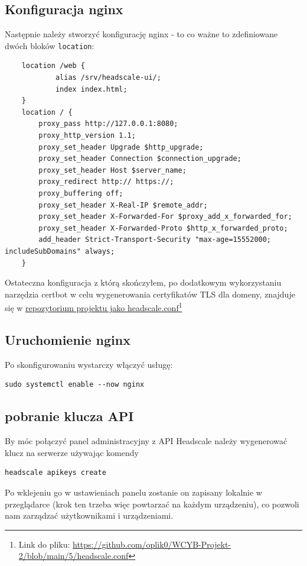 \documentclass[../main.tex]{subfiles}
\begin{document}
\begin{samepage}    
\subsection{Konfiguracja nginx}
Następnie należy stworzyć konfigurację nginx - to co ważne to zdefiniowane dwóch bloków \texttt{location}:
\begin{verbatim}
    location /web {
            alias /srv/headscale-ui/;
            index index.html;
    }
    location / {
        proxy_pass http://127.0.0.1:8080;
        proxy_http_version 1.1;
        proxy_set_header Upgrade $http_upgrade;
        proxy_set_header Connection $connection_upgrade;
        proxy_set_header Host $server_name;
        proxy_redirect http:// https://;
        proxy_buffering off;
        proxy_set_header X-Real-IP $remote_addr;
        proxy_set_header X-Forwarded-For $proxy_add_x_forwarded_for;
        proxy_set_header X-Forwarded-Proto $http_x_forwarded_proto;
        add_header Strict-Transport-Security "max-age=15552000; includeSubDomains" always;
    }
\end{verbatim}
Ostateczna konfiguracja z którą skończyłem, po dodatkowym wykorzystaniu narzędzia certbot w celu wygenerowania certyfikatów TLS dla domeny, znajduje się w \href{https://github.com/oplik0/WCYB-Projekt-2/blob/main/5/headscale.conf}{repozytorium projektu jako headscale.conf}\footnote{Link do pliku: \url{https://github.com/oplik0/WCYB-Projekt-2/blob/main/5/headscale.conf}}
\end{samepage}

\subsection{Uruchomienie nginx}

Po skonfigurowaniu wystarczy włączyć usługę:
\begin{verbatim}
sudo systemctl enable --now nginx
\end{verbatim}

\subsection{pobranie klucza API}
By móc połączyć panel administracyjny z API Headscale należy wygenerować klucz na serwerze używając komendy
\begin{verbatim}
headscale apikeys create
\end{verbatim}
Po wklejeniu go w ustawieniach panelu zostanie on zapisany lokalnie w przeglądarce (krok ten trzeba więc powtarzać na każdym urządzeniu), co pozwoli nam zarządzać użytkownikami i urządzeniami.
\end{document}
